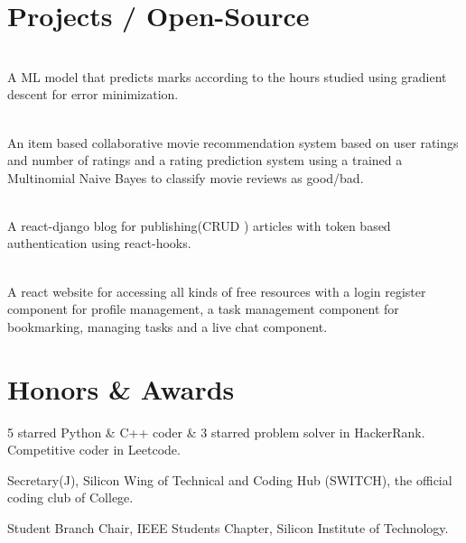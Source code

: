\documentclass[]{deedy-resume-openfont}
\begin{document}
\section{Projects / Open-Source}
\raggedright

    \hfill {}\\
    A ML model that predicts marks according to the hours studied using gradient descent for error minimization.\\
    \sectionsep
  

    \hfill {}\\
    An item based collaborative movie recommendation system based on user ratings and number of ratings and a rating prediction system using a trained a Multinomial Naive Bayes to classify movie reviews as good/bad.\\
    \sectionsep
  

    \hfill {}\\
    A react-django blog for publishing(CRUD ) articles with token based authentication using react-hooks. \\
    \sectionsep
  

    \hfill {}\\
    A react website for accessing all kinds of free resources with a login register component for profile management, a task management component for bookmarking, managing tasks and a live chat component.\\
    \sectionsep
%
%
\section{Honors \& Awards}
\begin{tightemize}
\item 5 starred Python \& C++ coder \& 3 starred problem solver in HackerRank. Competitive coder in Leetcode.\\
\item Secretary(J), Silicon Wing of Technical and Coding Hub (SWITCH), the official coding club of College.\\
\item Student Branch Chair, IEEE Students\textquotesingle{} Chapter, Silicon Institute of Technology.\\
\end{tightemize}
     \ 
     
\end{document}

